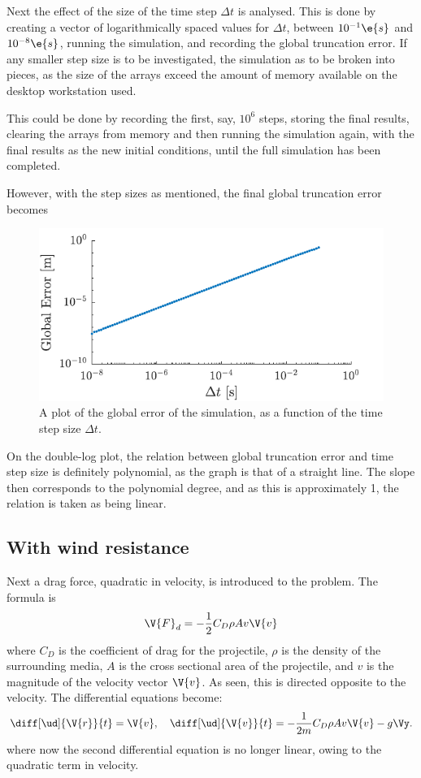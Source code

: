 \documentclass[a4paper,10pt]{article} 	%
\numberwithin{equation}{section}
\begin{document}
	
	Next the effect of the size of the time step $ \Delta t $ is analysed. This is done by creating a vector of logarithmically spaced values for $ \Delta t $, between $ 10^{-1} \e{s} $ and $ 10^{-8} \e{s}$, running the simulation, and recording the global truncation error. If any smaller step size is to be investigated, the simulation as to be broken into pieces, as the size of the arrays exceed the amount of memory available on the desktop workstation used.
	
	This could be done by recording the first, say, $ 10^6 $ steps, storing the final results, clearing the arrays from memory and then running the simulation again, with the final results as the new initial conditions, until the full simulation has been completed.
	
	However, with the step sizes as mentioned, the final global truncation error becomes
	\begin{figure}[H]
		\centering
		\includegraphics[width=0.5\linewidth]{projError.pdf}
		\caption{A plot of the global error of the simulation, as a function of the time step size $ \Delta t $.}
		\label{fig:projError}
	\end{figure}
	On the double-log plot, the relation between global truncation error and time step size is definitely polynomial, as the graph is that of a straight line. The slope then corresponds to the polynomial degree, and as this is approximately 1, the relation is taken as being linear.
	
	\subsection{With wind resistance}
	Next a drag force, quadratic in velocity, is introduced to the problem. The formula is
	\begin{equation}
		\V{F}_d = -\frac{1}{2}C_D \rho A v \V{v}
 	\end{equation} 
 	where $ C_D $ is the coefficient of drag for the projectile, $ \rho $ is the density of the surrounding media, $ A $ is the cross sectional area of the projectile, and $ v $ is the magnitude of the velocity vector $ \V{v} $. As seen, this is directed opposite to the velocity. The differential equations become:
 	\begin{equation}
 			\diff[\ud]{\V{r}}{t} = \V{v}, \quad \diff[\ud]{\V{v}}{t} = -\frac{1}{2m}C_D \rho A v \V{v} -g\Vy.
 	\end{equation}
 	where now the second differential equation is no longer linear, owing to the quadratic term in velocity.
 	
\end{document}
